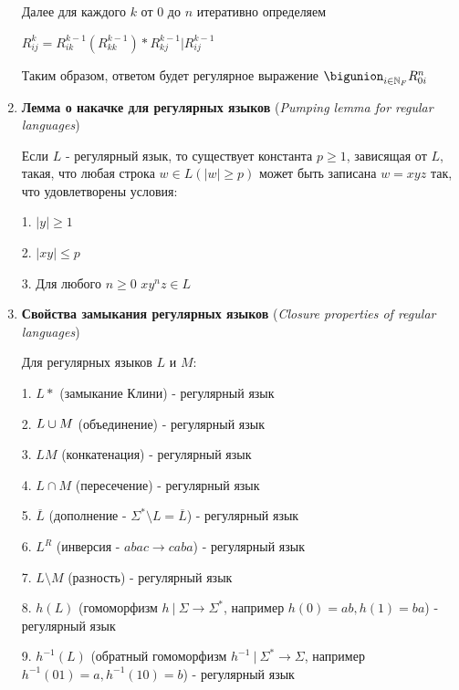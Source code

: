 \documentclass[12pt]{article}
\begin{document}
\begin{enumerate}
        Далее для каждого $k$ от $0$ до $n$ итеративно определяем

        $R^k_{ij} = R^{k - 1}_{ik} (R^{k - 1}_{kk})* R^{k-1}_{kj} | R^{k-1}_{ij}$

        Таким образом, ответом будет регулярное выражение $\bigunion_{i \in \Natural_F} R^n_{0i}$

        \item \textbf{Лемма о накачке для регулярных языков} (\textit{Pumping lemma for regular languages})

        Если $L$ - регулярный язык, то существует константа $p \geq 1$, зависящая от $L$, такая, что любая строка $w \in L (|w| \geq p)$
        может быть записана $w = xyz$ так, что удовлетворены условия:

        1. $|y| \geq 1$

        2. $|xy| \leq p$

        3. Для любого $n \geq 0$ $xy^n z \in L$

        \item \textbf{Свойства замыкания регулярных языков} (\textit{Closure properties of regular languages})

        Для регулярных языков $L$ и $M$:

        1. $L*$ (замыкание Клини) - регулярный язык

        2. $L \cup M$ (объединение) - регулярный язык

        3. $LM$ (конкатенация) - регулярный язык

        4. $L \cap M$ (пересечение) - регулярный язык

        5. $\overline{L}$ (дополнение - $\Sigma^* \setminus L = \overline{L}$) - регулярный язык

        6. $L^R$ (инверсия - $abac \to caba$) - регулярный язык

        7. $L \setminus M$ (разность) - регулярный язык

        8. $h(L)$ (гомоморфизм $h \ | \ \Sigma \to \Sigma^*$, например $h(0) = ab, h(1) = ba$) - регулярный язык

        9. $h^{-1}(L)$ (обратный гомоморфизм $h^{-1} \ | \ \Sigma^* \to \Sigma$, например $h^{-1}(01) = a, h^{-1}(10) = b$) - регулярный язык

        \smallvspace

        \begin{minipage}{\linewidth}
            \begin{figure}


\end{figure}
\end{minipage}
\end{enumerate}
\end{document}
